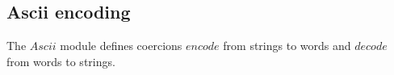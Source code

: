 \subsection{Ascii encoding}

The $Ascii$ module defines coercions 
$encode$ from strings to words 
and $decode$ from words to strings.


